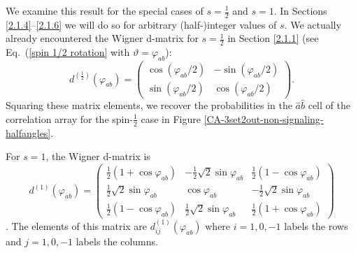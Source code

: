We examine this result for the special cases of $s= \frac12$ and $s=1$. In Sections \ref{2.1.4}--\ref{2.1.6} we will do so for arbitrary (half-)integer values of $s$. We actually already encountered the Wigner d-matrix for $s=\frac12$ in Section \ref{2.1.1} (see Eq.\ (\ref{spin 1/2 rotation} with $\vartheta = \varphi_{ab}$):
\begin{equation}
d^{(\frac12)}(\varphi_{ab}) = 
\left( 
\begin{array}{cc}
\cos{(\varphi_{ab}/2)} & -\sin{(\varphi_{ab}/2)}  \\[.4 cm]
\sin{(\varphi_{ab}/2)}  & \cos{(\varphi_{ab}/2)} 
\end{array}
\right).
\label{Messiah 1/2} 
\end{equation}
Squaring these matrix elements, we recover the probabilities in the $\hat{a}\hat{b}$ cell of the correlation array for the spin-$\frac12$ case in Figure \ref{CA-3set2out-non-signaling-halfangles}.

For $s=1$, the Wigner d-matrix is
\begin{equation}
d^{(1)}(\varphi_{ab}) = 
\left( 
\begin{array}{ccc}
\frac12 (1 + \cos{\varphi_{ab}}) & -\frac12 \sqrt{2} \sin{\varphi_{ab}} & \frac12 (1 - \cos{\varphi_{ab}}) \\[.4 cm]
\frac12 \sqrt{2} \sin{\varphi_{ab}}  & \cos{\varphi_{ab}} & -\frac12 \sqrt{2} \sin{\varphi_{ab}}  \\[.4 cm]
\frac12 (1 - \cos{\varphi_{ab}}) & \frac12 \sqrt{2} \sin{\varphi_{ab}}  & \frac12 (1 + \cos{\varphi_{ab}}) 
\end{array}
\right)
\label{Messiah 1}
\end{equation}
\citep[Vol.\ 2, p.\ 1073, Eq.\ (C.75) with $\alpha = \gamma = 0$ and $\beta = \varphi_{ab}$; see also Wigner, 1931, p.\ 182, Eq.\ 29]{Messiah 1962}.
The elements of this matrix are $d^{(1)}_{ij}(\varphi_{ab})$ where $i = 1, 0, -1$ labels the rows and $j= 1, 0, -1$ labels the columns. 

